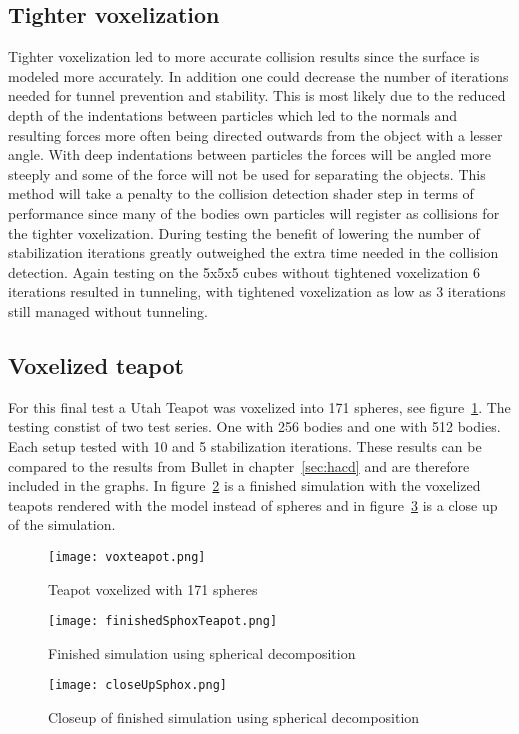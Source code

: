 \subsection{Tighter voxelization}\label{sec:tight}
Tighter voxelization led to more accurate collision results since the surface is modeled
more accurately. In addition one could decrease the number of iterations needed
for tunnel prevention and stability. This is most likely due to the reduced depth
of the indentations between particles which led to the normals and resulting forces more often
being directed outwards from the object with a lesser angle.
 With deep indentations between particles the forces will be angled more steeply and
  some of the force will not be used for separating the objects.
This method will take a penalty to the collision detection shader step in
terms of performance since many of the bodies own particles will register as collisions
for the tighter voxelization. During testing the benefit of lowering the number of
stabilization iterations greatly outweighed the extra time needed in the collision
detection. Again testing on the 5x5x5 cubes without tightened voxelization 6 iterations resulted in
tunneling, with tightened voxelization as low as 3 iterations still managed without tunneling.

\subsection{Voxelized teapot}\label{sec:teapot}
For this final test a Utah Teapot was voxelized into 171 spheres, see figure~\ref{fig:voxteapot}.
The testing constist of two test series. One with 256 bodies and one with 512 bodies.
Each setup tested with 10 and 5 stabilization iterations. These results can be compared to the
results from Bullet in chapter~\ref{sec:hacd} and are therefore included in the graphs.
In figure~\ref{fig:voxFinish} is a finished simulation with the voxelized teapots rendered
with the model instead of spheres and
in figure~\ref{fig:voxCloseup} is a close up of the simulation.

\begin{figure}[H]
  \centering
  \texttt{[image: voxteapot.png]}
  \caption{Teapot voxelized with 171 spheres}
  \label{fig:voxteapot}
\end{figure}

\begin{figure}[H]
  \centering
  \texttt{[image: finishedSphoxTeapot.png]}
  \caption{Finished simulation using spherical decomposition}
  \label{fig:voxFinish}
\end{figure}
\begin{figure}[H]
  \centering
  \texttt{[image: closeUpSphox.png]}
  \caption{Closeup of finished simulation using spherical decomposition}
  \label{fig:voxCloseup}
\end{figure}


